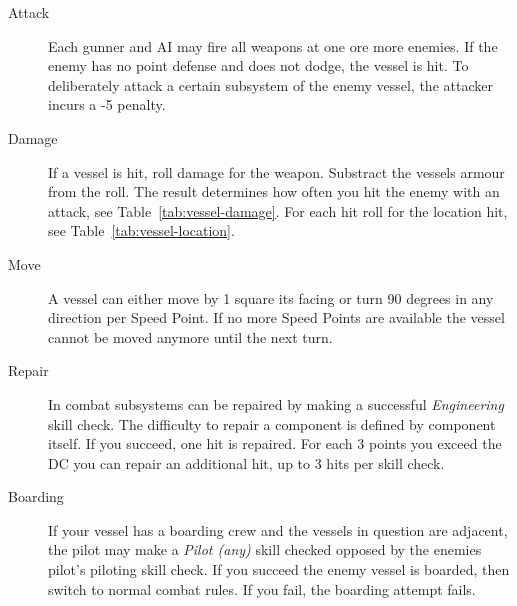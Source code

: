 \begin{description}
  \item[Attack]
  Each gunner and AI may fire all weapons at one ore more enemies. If the enemy has no point defense and does not dodge, the vessel is hit. To deliberately attack a certain subsystem of the enemy vessel, the attacker incurs a -5 penalty.
  \item[Damage]
  If a vessel is hit, roll damage for the weapon. Substract the vessels armour from the roll. The result determines how often you hit the enemy with an attack, see Table~\ref{tab:vessel-damage}. For each hit roll for the location hit, see Table~\ref{tab:vessel-location}.
  \item[Move]
  A vessel can either move by 1 square its facing or turn 90 degrees in any direction per Speed Point. If no more Speed Points are available the vessel cannot be moved anymore until the next turn.
  \item[Repair]
  In combat subsystems can be repaired by making a successful \emph{Engineering} skill check. The difficulty to repair a component is defined by component itself. If you succeed, one hit is repaired. For each 3 points you exceed the DC you can repair an additional hit, up to 3 hits per skill check.
  \item[Boarding]
  If your vessel has a boarding crew and the vessels in question are adjacent, the pilot may make a \emph{Pilot (any)} skill checked opposed by the enemies pilot's piloting skill check. If you succeed the enemy vessel is boarded, then switch to normal combat rules. If you fail, the boarding attempt fails.
\end{description}

